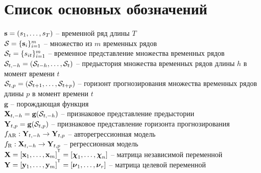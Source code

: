 \chapter*{Список основных обозначений}
$\mathbf{s} = (s_1, \dots, s_T)$ -- временной ряд длины $T$ \\
$\mathcal{S} = \{\mathbf{s}_i\}_{i=1}^m$ -- множество из $m$ временных рядов \\
$\mathcal{S}_t = \{s_{it}\}_{i=1}^m$ -- временное представление множества временных рядов \\
$\mathcal{S}_{t, -h} = (\mathcal{S}_{t - h}, \dots, \mathcal{S}_{t})$ -- предыстория множества временных рядов длины $h$ в момент времени $t$ \\
$\mathcal{S}_{t, p} = (\mathcal{S}_{t + 1}, \dots, \mathcal{S}_{t + p})$ -- горизонт прогнозирования множества временных рядов длины $p$ в момент времени $t$ \\
$\mathbf{g}$ -- порождающая функция \\
$\mathbf{X}_{t, -h} = \mathbf{g}(\mathcal{S}_{t, -h})$ -- признаковое представление предыстории \\
$\mathbf{Y}_{t, p} = \mathbf{g}(\mathcal{S}_{t, p})$ -- признаковое представление горизонта прогнозирования \\
$f_{\text{AR}}: \mathbf{Y}_{t, -h} \rightarrow \mathbf{Y}_{t, p}$ -- авторегрессионная модель \\
$f_{\text{R}}: \mathbf{X}_{t, -h} \rightarrow \mathbf{Y}_{t, p}$ -- регрессионная модель \\
$\bX = [\bx_1, \dots, \bx_m]^{\T} =  [\bchi_1, \dots, \bchi_n]$ -- матрица независимой переменной \\
$\bY = [\by_1, \dots, \by_m]^{\T} =  [\bnu_1, \dots, \bnu_r]$ -- матрица целевой переменной \\




